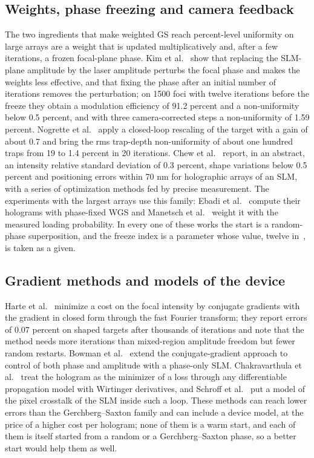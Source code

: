 \subsection{Weights, phase freezing and camera feedback}\label{sec:rel-wgs}

The two ingredients that make weighted GS reach percent-level uniformity on large arrays are a weight that is updated multiplicatively and, after a few iterations, a frozen focal-plane phase. Kim et al.~\cite{kim2019} show that replacing the SLM-plane amplitude by the laser amplitude
perturbs the focal phase and makes the weights less effective, and that fixing the phase after an initial number of iterations removes the perturbation; on 1500 foci with twelve iterations before the freeze they obtain a modulation efficiency of 91.2 percent and a non-uniformity below 0.5 percent, and
with three camera-corrected steps a non-uniformity of 1.59 percent. Nogrette et al.~\cite{nogrette} apply a closed-loop rescaling of the target with a gain of about 0.7 and bring the rms trap-depth non-uniformity of about one hundred traps from 19 to 1.4 percent in 20 iterations. Chew et al.~\cite{chew}
report, in an abstract, an intensity relative standard deviation of 0.3 percent, shape variations below 0.5 percent and positioning errors within 70 nm for holographic arrays of an SLM, with a series of optimization methods fed by precise measurement. The experiments with the largest arrays use this family:
Ebadi et al.~\cite{ebadi} compute their holograms with phase-fixed WGS and Manetsch et al.~\cite{manetsch} weight it with the measured loading probability. In every one of these works the start is a random-phase superposition, and the freeze index is a parameter whose value, twelve in~\cite{kim2019}, is taken as a given.

\subsection{Gradient methods and models of the device}\label{sec:rel-grad}

Harte et al.~\cite{harte} minimize a cost on the focal intensity by conjugate gradients with the gradient in closed form through the fast Fourier transform; they report errors of 0.07 percent on shaped targets after thousands of iterations and note that the method needs more iterations than mixed-region amplitude freedom but fewer
random restarts. Bowman et al.~\cite{bowman} extend the conjugate-gradient approach to control of both phase and amplitude with a phase-only SLM. Chakravarthula et al.~\cite{wirtinger} treat the hologram as the minimizer of a loss through any differentiable propagation model with Wirtinger derivatives, and Schroff et al.~\cite{schroff} put a model of the
pixel crosstalk of the SLM inside such a loop. These methods can reach lower errors than the Gerchberg--Saxton family and can include a device model, at the price of a higher cost per hologram; none of them is a warm start, and each of them is itself started from a random or a Gerchberg--Saxton phase, so a better start would help them as well.

